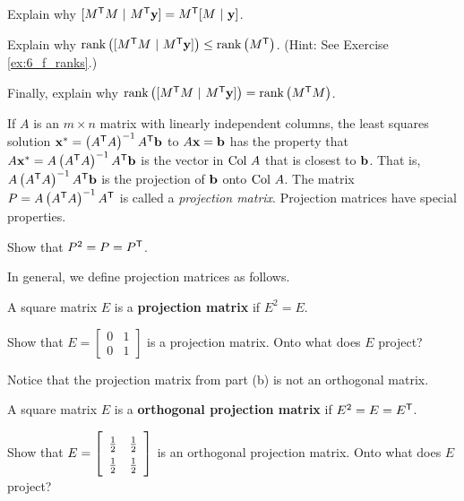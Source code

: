 \item  Explain why $[M^{\mathsf{T}}M \ | \ M^{\mathsf{T}}\mathbf{y}] = M^{\mathsf{T}}[M \ | \ \mathbf{y}]$. 

\item Explain why $\rank\left([M^{\tr}M \ | \ M^{\tr}\vy]\right) \leq \rank\left(M^{\tr} \right)$. (Hint: See Exercise \ref{ex:6_f_ranks}.)

\item Finally, explain why $\text{rank}\left([M^{\mathsf{T}}M \ | \ M^{\mathsf{T}}\mathbf{y}]\right) = \text{rank}\left(M^{\mathsf{T}}M\right)$. 

\ea

\item If $A$ is an $m \times n$ matrix with linearly independent columns, the least squares solution $\mathbf{x}^* = \left(A^{\mathsf{T}}A\right)^{-1}A^{\mathsf{T}} \mathbf{b}$ to $A \mathbf{x} = \mathbf{b}$ has the property that $A \mathbf{x}^* = A\left(A^{\mathsf{T}}A\right)^{-1}A^{\mathsf{T}} \mathbf{b}$ is the vector in $\text{Col } A$ that is closest to $\mathbf{b}$. That is, $A\left(A^{\mathsf{T}}A\right)^{-1}A^{\mathsf{T}} \mathbf{b}$ is the projection of $\mathbf{b}$ onto $\text{Col } A$. The matrix $P = A\left(A^{\mathsf{T}}A\right)^{-1}A^{\mathsf{T}}$ is called a \emph{projection matrix}. Projection matrices have special properties. 
\ba
\item Show that $P^2 = P = P^{\mathsf{T}}$.

\item In general, we define projection matrices as follows.

\begin{definition} A square matrix $E$ is a \textbf{projection matrix} if $E^2 = E$. 
\end{definition}
Show that $E = \left[ \begin{array}{cc} 0&1\\  0&1 \end{array} \right]$ is a projection matrix. Onto what does $E$ project?

\item Notice that the projection matrix from part (b) is not an orthogonal matrix. 
	
\begin{definition} A square matrix $E$ is a \textbf{orthogonal projection matrix} if $E^2 = E = E^{\mathsf{T}}$. 
\end{definition}

Show that $E = \left[ \renewcommand{\arraystretch}{1.4} \begin{array}{cc} \frac{1}{2}&\frac{1}{2} \\  \frac{1}{2}&\frac{1}{2} \end{array} \right]$ is an orthogonal projection matrix. Onto what does $E$ project?
	
